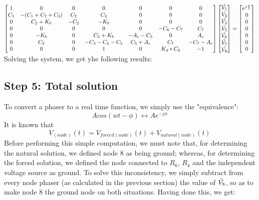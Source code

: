 $\begin{bmatrix}
1 & 0 & 0 & 0 & 0 & 0 & 0 \\
C_1 & -(C_1+C_2+C_3)&C_2&C_3&0&0&0 \\
0&     C_2+K_b& -C_2&       -K_b&      0&       0&   0 \\
0&         0&   0&         0&      0&  -C_6-C_7&  C_7 \\
0&       -K_b&   0&     C_5+K_b& -A_c-C_5&       0&  A_c \\
0&        C_3&   0& -C_3-C_4-C_5&  C_5+A_c&      C_7& -C_7-A_c \\
0&         0&   0&         1&      0&   K_d*C_6&  -1 \\
\end{bmatrix}
\begin{bmatrix}
  \Tilde{V_1}\\
  \Tilde{V_2}\\
  \Tilde{V_3}\\
  \Tilde{V_5}\\
  \Tilde{V_6}\\
  \Tilde{V_7}\\
  \Tilde{V_8}\\
  \end{bmatrix}
=
\begin{bmatrix}
  e^{j\frac{\pi}{2}}  \\
  0\\
  0\\
  0\\
  0\\
  0\\
  0\\
  \end{bmatrix}$
Solving the system, we get yhe following results:

     

\subsection{ Step 5: Total solution}

To convert a phaser to a real time function, we simply use the "equivalence":
\begin{equation*}
    Acos(wt - \phi) \leftrightarrow Ae^{-j\phi}
\end{equation*}
It is known that 
\begin{equation*}
    V_{(node)}(t) = V_{forced(node)}(t) + V_{natural(node)}(t)
\end{equation*}
Before performing this simple computation, we must note that, for determining the natural solution, we defined node 8 as being ground; whereas, for determining the forced solution, we defined the node connected to $R_6$, $R_4$ and the independent voltage source as ground. To solve this inconsistency, we simply subtract from every node phaser (as calculated in the previous section) the value of $\Tilde{V_8}$, so as to make node 8 the ground node on both situations.
Having done this, we get:


